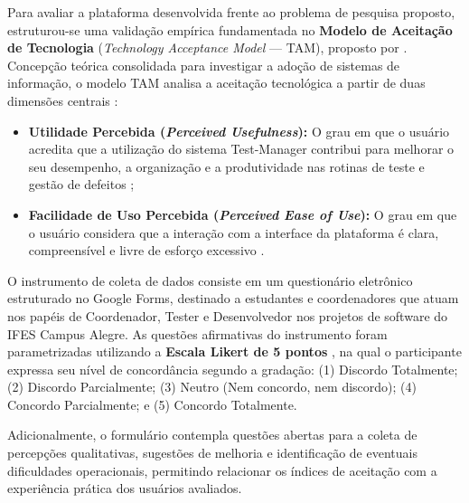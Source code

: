 Para avaliar a plataforma desenvolvida frente ao problema de pesquisa proposto, estruturou-se uma validação empírica fundamentada no \textbf{Modelo de Aceitação de Tecnologia} (\textit{Technology Acceptance Model} --- TAM), proposto por . Concepção teórica consolidada para investigar a adoção de sistemas de informação, o modelo TAM analisa a aceitação tecnológica a partir de duas dimensões centrais \cite{davis1989, venkatesh2000}:
\begin{itemize}
    \item \textbf{Utilidade Percebida (\textit{Perceived Usefulness}):} O grau em que o usuário acredita que a utilização do sistema Test-Manager contribui para melhorar o seu desempenho, a organização e a produtividade nas rotinas de teste e gestão de defeitos \cite{davis1989};
    \item \textbf{Facilidade de Uso Percebida (\textit{Perceived Ease of Use}):} O grau em que o usuário considera que a interação com a interface da plataforma é clara, compreensível e livre de esforço excessivo \cite{davis1989}.
\end{itemize}

O instrumento de coleta de dados consiste em um questionário eletrônico estruturado no Google Forms, destinado a estudantes e coordenadores que atuam nos papéis de Coordenador, Tester e Desenvolvedor nos projetos de software do IFES Campus Alegre. As questões afirmativas do instrumento foram parametrizadas utilizando a \textbf{Escala Likert de 5 pontos} \cite{likert1932}, na qual o participante expressa seu nível de concordância segundo a gradação: (1) Discordo Totalmente; (2) Discordo Parcialmente; (3) Neutro (Nem concordo, nem discordo); (4) Concordo Parcialmente; e (5) Concordo Totalmente.

Adicionalmente, o formulário contempla questões abertas para a coleta de percepções qualitativas, sugestões de melhoria e identificação de eventuais dificuldades operacionais, permitindo relacionar os índices de aceitação com a experiência prática dos usuários avaliados.